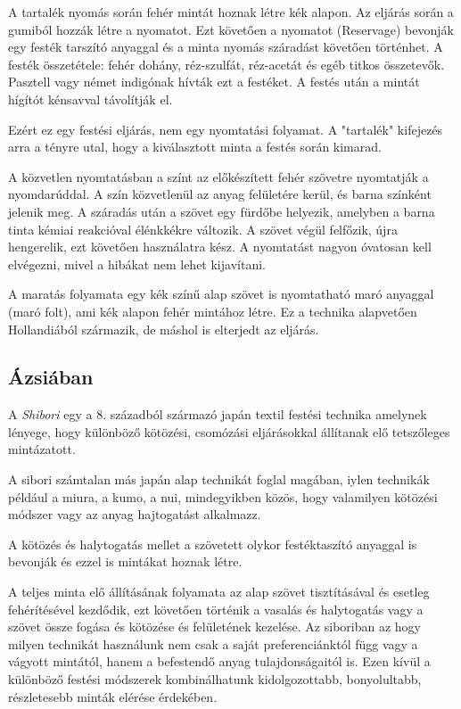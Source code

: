 \documentclass[fontsize=12pt, appendixprefix=true]{scrreprt}
\begin{document}
A tartalék nyomás során fehér mintát hoznak létre kék alapon. Az eljárás során a gumiból hozzák létre a nyomatot. Ezt követően a nyomatot (Reservage) bevonják egy festék tarszító anyaggal és a minta nyomás száradást követően történhet. A festék összetétele: fehér dohány, réz-szulfát, réz-acetát és egéb titkos összetevők. Pasztell vagy német indigónak hívták ezt a festéket. A festés után a mintát hígítót kénsavval távolítják el.

Ezért ez egy festési eljárás, nem egy nyomtatási folyamat. A "tartalék" kifejezés arra a tényre utal, hogy a kiválasztott minta a festés során kimarad.

A közvetlen nyomtatásban a színt az előkészített fehér szövetre nyomtatják a nyomdarúddal. A szín közvetlenül az anyag felületére kerül, és barna színként jelenik meg. A száradás után a szövet egy fürdőbe helyezik, amelyben a barna tinta kémiai reakcióval élénkkékre változik. A szövet végül felfőzik, újra hengerelik, ezt követően használatra kész. A nyomtatást nagyon óvatosan kell elvégezni, mivel a hibákat nem lehet kijavítani.

A maratás folyamata egy kék színű alap szövet is nyomtatható maró anyaggal (maró folt), ami kék alapon fehér mintához létre. Ez a technika alapvetően Hollandiából származik, de máshol is elterjedt az eljárás.

\subsection{Ázsiában}
A \textit{Shibori} egy a 8. századból származó japán textil festési technika amelynek lényege, hogy különböző kötözési, csomózási eljárásokkal állítanak elő tetszőleges mintázatott.

A sibori számtalan más japán alap technikát foglal magában, iylen technikák például a miura, a kumo, a nui, mindegyikben közös, hogy valamilyen kötözési módszer vagy az anyag hajtogatást alkalmazz. 

A kötözés és halytogatás mellet a szövetett olykor festéktaszító anyaggal is bevonják és ezzel is mintákat hoznak létre.

A teljes minta elő állításának folyamata az alap szövet tisztításával és esetleg fehérítésével kezdődik, ezt követően történik a vasalás és halytogatás vagy a szövet össze fogása és kötözése és felületének kezelése.
Az siboriban az hogy milyen technikát használunk nem csak a saját preferenciánktól függ vagy a vágyott mintától, hanem a befestendő anyag tulajdonságaitól is. Ezen kívül  a különböző festési módszerek kombinálhatunk kidolgozottabb, bonyolultabb, részletesebb minták elérése érdekében. 
\end{document}
